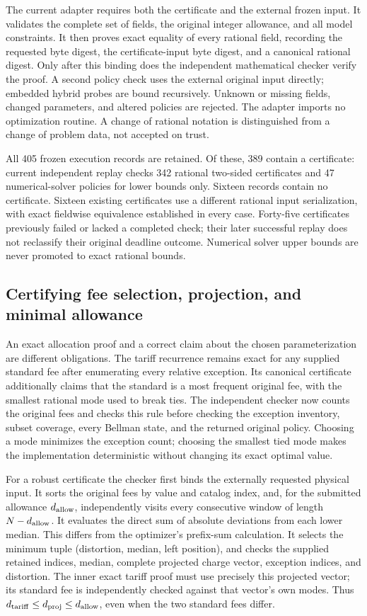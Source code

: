 \documentclass[11pt,letterpaper]{article}
\theoremstyle{definition}\newtheorem{remark}[theorem]{Remark}
\begin{document}
The current adapter requires both the certificate and the external frozen input. It validates the complete set of fields, the original integer allowance, and all model constraints. It then proves exact equality of every rational field, recording the requested byte digest, the certificate-input byte digest, and a canonical rational digest. Only after this binding does the independent mathematical checker verify the proof. A second policy check uses the external original input directly; embedded hybrid probes are bound recursively. Unknown or missing fields, changed parameters, and altered policies are rejected. The adapter imports no optimization routine. A change of rational notation is distinguished from a change of problem data, not accepted on trust.

All 405 frozen execution records are retained. Of these, 389 contain a certificate: current independent replay checks 342 rational two-sided certificates and 47 numerical-solver policies for lower bounds only. Sixteen records contain no certificate. Sixteen existing certificates use a different rational input serialization, with exact fieldwise equivalence established in every case. Forty-five certificates previously failed or lacked a completed check; their later successful replay does not reclassify their original deadline outcome. Numerical solver upper bounds are never promoted to exact rational bounds.

\subsection{Certifying fee selection, projection, and minimal allowance}\label{sec:semantic64}
An exact allocation proof and a correct claim about the chosen parameterization are different obligations. The tariff recurrence remains exact for any supplied standard fee after enumerating every relative exception. Its canonical certificate additionally claims that the standard is a most frequent original fee, with the smallest rational mode used to break ties. The independent checker now counts the original fees and checks this rule before checking the exception inventory, subset coverage, every Bellman state, and the returned original policy. Choosing a mode minimizes the exception count; choosing the smallest tied mode makes the implementation deterministic without changing its exact optimal value.

For a robust certificate the checker first binds the externally requested physical input. It sorts the original fees by value and catalog index, and, for the submitted allowance $d_{\rm allow}$, independently visits every consecutive window of length $N-d_{\rm allow}$. It evaluates the direct sum of absolute deviations from each lower median. This differs from the optimizer's prefix-sum calculation. It selects the minimum tuple (distortion, median, left position), and checks the supplied retained indices, median, complete projected charge vector, exception indices, and distortion. The inner exact tariff proof must use precisely this projected vector; its standard fee is independently checked against that vector's own modes. Thus $d_{\rm tariff}\leq d_{\rm proj}\leq d_{\rm allow}$, even when the two standard fees differ.
\end{document}
